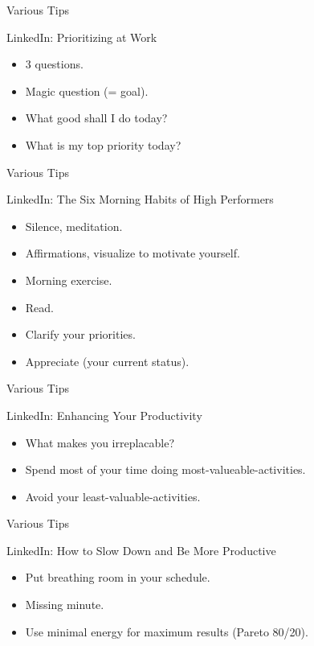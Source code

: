 \begin{frame}{Various Tips}
  \begin{block}{LinkedIn: Prioritizing at Work}
    \begin{itemize}
      \item 3 questions.
      \item Magic question (= goal).
      \item What good shall I do today?
      \item What is my top priority today?
    \end{itemize}
  \end{block}
\end{frame}

\begin{frame}{Various Tips}
  \begin{block}{LinkedIn: The Six Morning Habits of High Performers}
    \begin{itemize}
      \item Silence, meditation.
      \item Affirmations, visualize to motivate yourself.
      \item Morning exercise. 
      \item Read. 
      \item Clarify your priorities.
      \item Appreciate (your current status).
    \end{itemize}
  \end{block}
\end{frame}

\begin{frame}{Various Tips}
  \begin{block}{LinkedIn: Enhancing Your Productivity}
    \begin{itemize}
      \item What makes you irreplacable?
      \item Spend most of your time doing most-valueable-activities.
      \item Avoid your least-valuable-activities.
    \end{itemize}
  \end{block}
\end{frame}

\begin{frame}{Various Tips}
  \begin{block}{LinkedIn: How to Slow Down and Be More Productive}
    \begin{itemize}
      \item Put breathing room in your schedule.
      \item Missing minute.
      \item Use minimal energy for maximum results (Pareto 80/20).
    \end{itemize}
  \end{block}
\end{frame}

